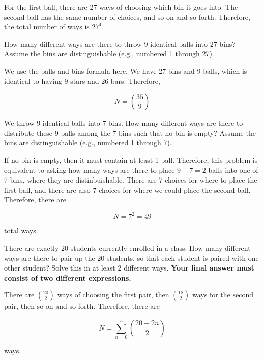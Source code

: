 \documentclass[11pt]{article}
\begin{document}
\begin{Parts}
  \begin{solution}
    For the first ball, there are 27 ways of choosing which bin it goes into. The second ball has the same number of choices, and so on and so forth. Therefore, the total number of ways is $27^4$.
  \end{solution}
  
\Part How many different ways are there to throw 9 identical balls
  into 27 bins? Assume the bins are distinguishable (e.g., numbered 1
  through 27).

  \begin{solution}
    We use the balls and bins formula here. We have 27 bins and 9 balls, which is identical to having 9 stars and 26 bars. Therefore, 

    \[ N = {35 \choose 9}\] 
  \end{solution}
 
\Part We throw 9 identical balls into 7 bins.
  How many different ways are there to distribute these 9 balls among
  the 7 bins such that no bin is empty? Assume the bins are
  distinguishable (e.g., numbered 1 through 7). 

  \begin{solution}
    If no bin is empty, then it must contain at least 1 ball. Therefore, this problem is equivalent to asking how many ways are there to place $9 - 7 = 2$ balls into one of 7 bins, where they are distinbuishable. There are 7 choices for where to place the first ball, and there are also 7 choices for where we could place the second ball. Therefore, there are 

    \[ N = 7^2 = 49\] 

    total ways.
  
  \end{solution}

\Part There are exactly 20 students currently enrolled in a class.
  How many different ways are there to pair up the 20 students, so
  that each student is paired with one other student? Solve this in at least 2 different ways. \textbf{Your final answer must consist of two different expressions. }


  \begin{solution}
    There are ${20 \choose 2}$ ways of choosing the first pair, then ${18 \choose 2}$ ways for the second pair, then so on and so forth. Therefore, there are 

    \[ N = \sum_{n = 0}^{5} {20 - 2n \choose 2}\]

    ways. 


\end{solution}
\end{Parts}
\end{document}
